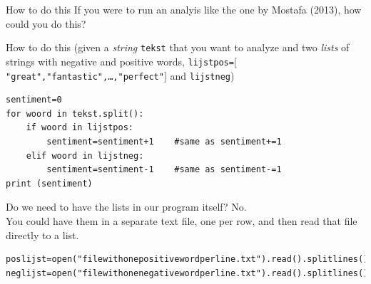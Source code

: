 \documentclass{beamer}
\begin{document}
\begin{frame}[fragile]{How to do this}
If you were to run an analyis like the one by Mostafa (2013), how could you do this?
\end{frame}

\begin{frame}[fragile]{How to do this}
\scriptsize{ 
(given a \emph{string} \texttt{tekst} that you want to analyze and two 
\emph{lists} of strings with negative and positive words, 
\texttt{lijstpos=$[$"great","fantastic",\ldots,"perfect"$]$} and \texttt{lijstneg})\\
}

\begin{lstlisting}
sentiment=0
for woord in tekst.split():
    if woord in lijstpos:
        sentiment=sentiment+1    #same as sentiment+=1
    elif woord in lijstneg:
        sentiment=sentiment-1    #same as sentiment-=1
print (sentiment)
\end{lstlisting}
\end{frame}


\begin{frame}[fragile]{Do we need to have the lists in our program itself?}
No.\\
You could have them in a separate text file, one per row, and then read that file directly to a list.\\
\begin{lstlisting}
poslijst=open("filewithonepositivewordperline.txt").read().splitlines()
neglijst=open("filewithonenegativewordperline.txt").read().splitlines()
\end{lstlisting}
\end{frame}


{
\begin{frame}[plain]
\end{frame}
}
\end{document}
